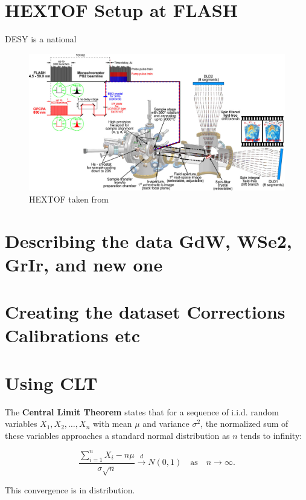 \section{HEXTOF Setup at FLASH}
\gls*{DESY} is a national 
\begin{figure}
    \centering
    \includegraphics[width=1\linewidth]{images/2024-08-27-10-50-01.png}
    \caption{HEXTOF taken from \cite{kutnyakhov_time-_2020}}
\end{figure}



\section{Describing the data GdW, WSe2, GrIr, and new one}

\section{Creating the dataset Corrections Calibrations etc}

\section{Using CLT}
The \textbf{Central Limit Theorem} states that for a sequence of i.i.d. random variables \(X_1, X_2, \ldots, X_n\) with mean \( \mu \) and variance \( \sigma^2 \), the normalized sum of these variables approaches a standard normal distribution as \(n\) tends to infinity:

\[
\frac{\sum_{i=1}^{n} X_i - n\mu}{\sigma \sqrt{n}} \xrightarrow{d} N(0, 1) \quad \text{as} \quad n \to \infty.
\]

This convergence is in distribution.
